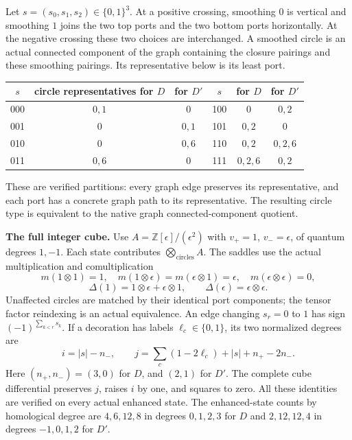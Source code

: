 \documentclass[10pt]{article}
\newcommand{\Z}{\mathbb Z}
\newcommand{\eps}{\epsilon}
\begin{document}
Let $s=(s_0,s_1,s_2)\in\{0,1\}^3$. At a positive crossing, smoothing $0$ is vertical
and smoothing $1$ joins the two top ports and the two bottom ports horizontally.
At the negative crossing these two choices are interchanged. A smoothed circle
is an actual connected component of the graph containing the closure pairings
and these smoothing pairings. Its representative below is its least port.
\begin{center}
\begin{tabular}{c@{\quad}c@{\quad}c@{\qquad}c@{\quad}c@{\quad}c}
\toprule
$s$ & circle representatives for $D$ & for $D'$ & $s$ & for $D$ & for $D'$\\
\midrule
000 & $0,1$ & $0$ & 100 & $0$ & $0,2$\\
001 & $0$ & $0,1$ & 101 & $0,2$ & $0$\\
010 & $0$ & $0,6$ & 110 & $0,2$ & $0,2,6$\\
011 & $0,6$ & $0$ & 111 & $0,2,6$ & $0,2$\\
\bottomrule
\end{tabular}
\end{center}
These are verified partitions: every graph edge preserves its representative,
and each port has a concrete graph path to its representative. The resulting
circle type is equivalent to the native graph connected-component quotient.

\textbf{The full integer cube.}
Use $A=\Z[\eps]/(\eps^2)$ with $v_+=1$, $v_-=\eps$, of quantum degrees $1,-1$.
Each state contributes $\bigotimes_{\text{circles}} A$. The saddles use the actual
multiplication and comultiplication
\[
 m(1\otimes1)=1,\quad m(1\otimes\eps)=m(\eps\otimes1)=\eps,\quad
 m(\eps\otimes\eps)=0,
\]
\[
 \Delta(1)=1\otimes\eps+\eps\otimes1,\qquad
 \Delta(\eps)=\eps\otimes\eps.
\]
Unaffected circles are matched by their identical port components; the tensor
factor reindexing is an actual equivalence. An edge changing $s_r=0$ to $1$
has sign $(-1)^{\sum_{k<r}s_k}$. If a decoration has labels $\ell_c\in\{0,1\}$,
its two normalized degrees are
\[
 i=|s|-n_-,\qquad j=\sum_c(1-2\ell_c)+|s|+n_+-2n_-.
\]
Here $(n_+,n_-)=(3,0)$ for $D$, and $(2,1)$ for $D'$. The complete cube differential
preserves $j$, raises $i$ by one, and squares to zero. All these identities are
verified on every actual enhanced state. The enhanced-state counts by
homological degree are $4,6,12,8$ in degrees $0,1,2,3$ for $D$ and
$2,12,12,4$ in degrees $-1,0,1,2$ for $D'$.
\end{document}
